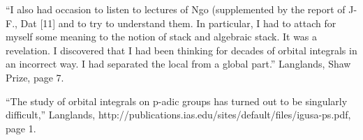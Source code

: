 \documentclass[brochure,english,12pt]{bourbaki}
\begin{document}
``I also had occasion to listen to lectures of Ngo (supplemented by the report of J-F., Dat [11] 
and to try to understand them. In particular, I had to attach for myself some meaning to the 
notion of stack and algebraic stack. It was a revelation. I discovered that I had been thinking 
for decades of orbital integrals in an incorrect way. I had separated the local from a global 
part.'' Langlands, Shaw Prize, page 7.



``The study of orbital integrals on p-adic groups has turned out to be singularly difficult,'' Langlands, 
http://publications.ias.edu/sites/default/files/igusa-ps.pdf,
page 1.

\end{document}
